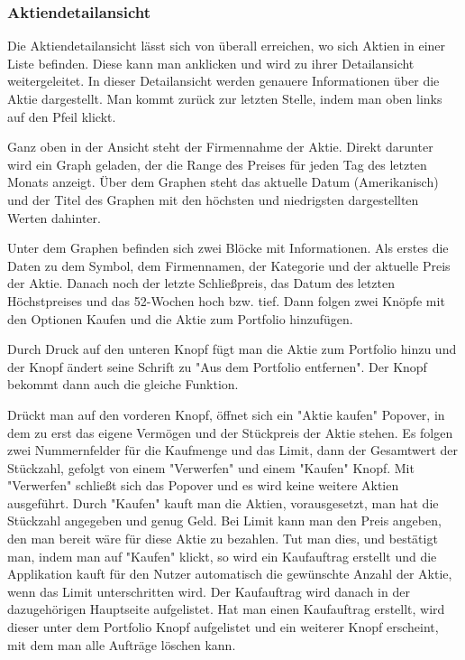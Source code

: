 \documentclass[10pt]{scrartcl}
\begin{document}
\subsubsection{Aktiendetailansicht}
Die Aktiendetailansicht lässt sich von überall erreichen, wo sich Aktien in einer Liste befinden. Diese kann man anklicken und wird zu ihrer Detailansicht weitergeleitet. In dieser Detailansicht werden genauere Informationen über die Aktie dargestellt. Man kommt zurück zur letzten Stelle, indem man oben links auf den Pfeil klickt.

Ganz oben in der Ansicht steht der Firmennahme der Aktie. Direkt darunter wird ein Graph geladen, der die Range des Preises für jeden Tag des letzten Monats anzeigt. Über dem Graphen steht das aktuelle Datum (Amerikanisch) und der Titel des Graphen mit den höchsten und niedrigsten dargestellten Werten dahinter. 

Unter dem Graphen befinden sich zwei Blöcke mit Informationen. Als erstes die Daten zu dem Symbol, dem Firmennamen, der Kategorie und der aktuelle Preis der Aktie. Danach noch der letzte Schließpreis, das Datum des letzten Höchstpreises und das 52-Wochen hoch bzw. tief.
Dann folgen zwei Knöpfe mit den Optionen Kaufen und die Aktie zum Portfolio hinzufügen.

Durch Druck auf den unteren Knopf fügt man die Aktie zum Portfolio hinzu und der Knopf ändert seine Schrift zu "Aus dem Portfolio entfernen". Der Knopf bekommt dann auch die gleiche Funktion.

Drückt man auf den vorderen Knopf, öffnet sich ein "Aktie kaufen" Popover, in dem zu erst das eigene Vermögen und der Stückpreis der Aktie stehen. Es folgen zwei Nummernfelder für die Kaufmenge und das Limit, dann der Gesamtwert der Stückzahl, gefolgt von einem "Verwerfen" und einem "Kaufen" Knopf. Mit "Verwerfen" schließt sich das Popover und es wird keine weitere Aktien ausgeführt. Durch "Kaufen" kauft man die Aktien, vorausgesetzt, man hat die Stückzahl angegeben und genug Geld. Bei Limit kann man den Preis angeben, den man bereit wäre für diese Aktie zu bezahlen. Tut man dies, und bestätigt man, indem man auf "Kaufen" klickt, so wird ein Kaufauftrag erstellt und die Applikation kauft für den Nutzer automatisch die gewünschte Anzahl der Aktie, wenn das Limit unterschritten wird. Der Kaufauftrag wird danach in der dazugehörigen Hauptseite aufgelistet. Hat man einen Kaufauftrag erstellt, wird dieser unter dem Portfolio Knopf aufgelistet und ein weiterer Knopf erscheint, mit dem man alle Aufträge löschen kann.
\end{document}
